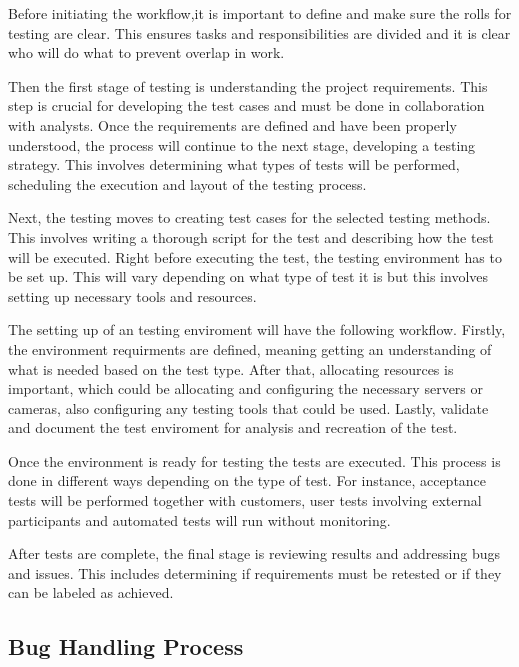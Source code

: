 \documentclass{article}
\begin{document}
Before initiating the workflow,it is important to define and make sure the rolls for testing are clear. This ensures tasks and responsibilities are divided and it is clear who will do what to prevent overlap in work. \newline

Then the first stage of testing is understanding the project requirements. This step is crucial for developing the test cases and must be done in collaboration with analysts. Once the requirements are defined and have been properly understood, the process will continue to the next stage, developing a testing strategy. This involves determining what types of tests will be performed, scheduling the execution and layout of the testing process. \newline

Next, the testing moves to creating test cases for the selected testing methods. This involves writing a thorough script for the test and describing how the test will be executed. Right before executing the test, the testing environment has to be set up. This will vary depending on what type of test it is but this involves setting up necessary tools and resources. \newline

The setting up of an testing enviroment will have the following workflow. Firstly, the environment requirments are defined, meaning getting an understanding of what is needed based on the test type. After that, allocating resources is important, which could be allocating and configuring the necessary servers or cameras, also configuring any testing tools that could be used. Lastly, validate and document the test enviroment for analysis and recreation of the test.\newline

Once the environment is ready for testing the tests are executed. This process is done in different ways depending on the type of test. For instance, acceptance tests will be performed together with customers, user tests involving external participants and automated tests will run without monitoring. \newline

After tests are complete, the final stage is reviewing results and addressing bugs and issues. This includes determining if requirements must be retested or if they can be labeled as achieved. 




\subsection{Bug Handling Process}
\end{document}
